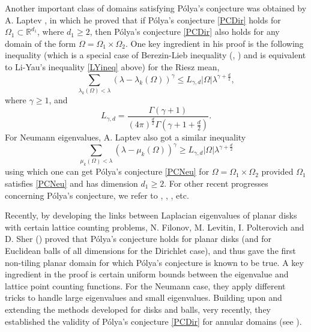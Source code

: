 \documentclass[11pt,letterpaper]{amsart}
\numberwithin{equation}{section}
\theoremstyle{plain}
\theoremstyle{plain}
\numberwithin{equation}{section}
\theoremstyle{remark}
\begin{document}
	Another important class of domains satisfying P\'olya's conjecture was obtained by A. Laptev  \cite{AL}, in which he proved that if P\'olya's conjecture \eqref{PCDir} holds for $\Omega_1 \subset \mathbb R^{d_1}$, where $d_1 \ge 2$, then P\'olya's conjecture \eqref{PCDir} also holds for any domain of the form $\Omega=\Omega_1 \times \Omega_2$. One key ingredient in his proof is the following inequality 	(which is a special case of Berezin-Lieb inequality (\cite{Bere72}, \cite{Lieb73}) and is equivalent to  Li-Yau's inequality \eqref{LYineq} above) for the Riesz mean,
	\begin{equation}\label{RieSumIn}
		\sum_{\lambda_k(\Omega)< \lambda} (\lambda-\lambda_k(\Omega))^\gamma \le  L_{\gamma,d}|\Omega| \lambda^{\gamma+\frac{d}{2}},
	\end{equation}
	where $\gamma \ge 1$, and
	\begin{equation}\label{Ld}
		L_{\gamma, d}= \frac{\Gamma(\gamma+1)}{(4\pi)^{\frac{d}{2}} \Gamma(\gamma+1+\frac{d}{2})}.
	\end{equation} 
	For Neumann eigenvalues, A. Laptev also got a similar inequality
	\begin{equation}\label{RieSumInN}
		\sum_{\mu_k(\Omega)< \lambda} (\lambda-\mu_k(\Omega))^\gamma \ge  L_{\gamma,d}|\Omega| \lambda^{\gamma+\frac{d}{2}} 
	\end{equation}
	using which one can get P\'olya's conjecture \eqref{PCNeu}  for   $\Omega=\Omega_1 \times \Omega_2$ provided $\Omega_1$ satisfies \eqref{PCNeu} and has dimension $d_1 \ge 2$. 
	For other recent progresses concerning P\'olya's conjecture, we refer to \cite{Fre01}, \cite{FLP}, \cite{Fre02}, \cite{LFH17} etc.
	
	
	Recently, by developing the links between Laplacian eigenvalues of planar disks with certain lattice counting problems, N. Filonov, M. Levitin, I. Polterovich and D. Sher (\cite{FLPS}) proved that P\'olya's conjecture holds for planar disks (and for Euclidean balls of all dimensions for the Dirichlet case), and thus gave the first non-tiling planar domain for which P\'olya's conjecture is known to be true. A key ingredient in the proof is certain uniform bounds between the eigenvalue and   lattice point counting functions. For the Neumann case, they apply different tricks to handle large eigenvalues and small eigenvalues. Building upon and extending the methods developed for disks and balls, very recently, they established the validity of P\'olya’s conjecture \eqref{PCDir} for annular domains (see \cite{Polyaann}).  
	
\end{document}
